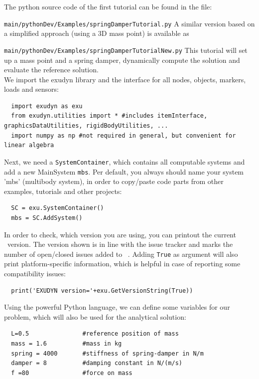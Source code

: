 The python source code of the first tutorial can be found in the file:
\bi
  \item[] \texttt{main/pythonDev/Examples/springDamperTutorial.py}
\ei
A similar version based on a simplified approach (using a 3D mass point) is available as
\bi
  \item[] \texttt{main/pythonDev/Examples/springDamperTutorialNew.py}
\ei
This tutorial will set up a mass point and a spring damper, dynamically compute the solution and evaluate the reference solution.
\vspace{6pt}\\
We import the exudyn library and the interface for all nodes, objects, markers, loads and sensors:
\pythonstyle\begin{lstlisting}
  import exudyn as exu
  from exudyn.utilities import * #includes itemInterface, graphicsDataUtilities, rigidBodyUtilities, ...
  import numpy as np #not required in general, but convenient for linear algebra
\end{lstlisting}
%
Next, we need a \texttt{SystemContainer}, which contains all computable systems and add a new MainSystem \texttt{mbs}.
Per default, you always should name your system 'mbs' (multibody system), in order to copy/paste code parts from other examples, tutorials and other projects:
\pythonstyle\begin{lstlisting}
  SC = exu.SystemContainer()
  mbs = SC.AddSystem()
\end{lstlisting}
%
In order to check, which version you are using, you can printout the current \codeName\ version. 
The version shown is in line with the issue tracker and marks the number of open/closed issues added to \codeName\ .
Adding \texttt{True} as argument will also print platform-specific information, which is helpful 
in case of reporting some compatibility issues:
\pythonstyle\begin{lstlisting}
  print('EXUDYN version='+exu.GetVersionString(True))
\end{lstlisting}
%
Using the powerful Python language, we can define some variables for our problem, which will also be used for the analytical solution:
\pythonstyle\begin{lstlisting}
  L=0.5               #reference position of mass
  mass = 1.6          #mass in kg
  spring = 4000       #stiffness of spring-damper in N/m
  damper = 8          #damping constant in N/(m/s)
  f =80               #force on mass
\end{lstlisting}
